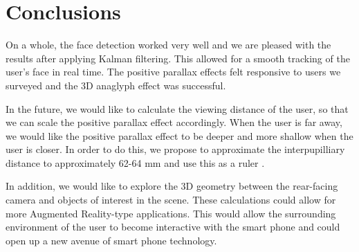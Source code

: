 \documentclass[12pt,twocolumn,letterpaper]{article}
\begin{document}
\section{Conclusions}
On a whole, the face detection worked very well and we are pleased with the results after applying Kalman filtering.  This allowed for a smooth tracking of the user's face in real time. The positive parallax effects felt responsive to users we surveyed and the 3D anaglyph effect was successful.  

In the future, we would like to calculate the viewing distance of the user, so that we can scale the positive parallax effect accordingly.  When the user is far away, we would like the positive parallax effect to be deeper and more shallow when the user is closer.  In order to do this, we propose to approximate the interpupilliary distance to approximately 62-64 mm and use this as a ruler \cite{Army}.  

In addition, we would like to explore the 3D geometry between the rear-facing camera and objects of interest in the scene.  These calculations could allow for more Augmented Reality-type applications. This would allow the surrounding environment of the user to become interactive with the smart phone and could open up a new avenue of smart phone technology.
    
\end{document}
